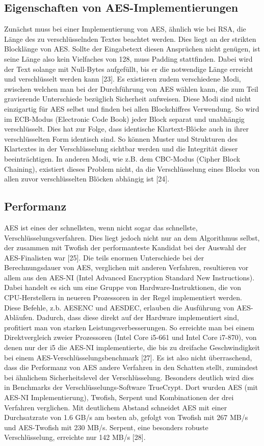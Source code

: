 \documentclass[conference,10pt,a4paper,twocolumn]{IEEEtran}
\begin{document}
\subsection{Eigenschaften von AES-Implementierungen}
Zunächst muss bei einer Implementierung von AES, ähnlich wie bei RSA, die Länge des zu verschlüsselnden Textes beachtet werden. Dies liegt an der strikten Blocklänge von AES. Sollte der Eingabetext diesen Ansprüchen nicht genügen, ist seine Länge also kein Vielfaches von 128, muss Padding stattfinden. Dabei wird der Text solange mit Null-Bytes aufgefüllt, bis er die notwendige Länge erreicht und verschlüsselt werden kann [23]. Es existieren zudem verschiedene Modi, zwischen welchen man bei der Durchführung von AES wählen kann, die zum Teil gravierende Unterschiede bezüglich Sicherheit aufweisen. Diese Modi sind nicht einzigartig für AES selbst und finden bei allen Blockchiffres Verwendung. So wird im ECB-Modus (Electronic Code Book) jeder Block separat und unabhängig verschlüsselt. Dies hat zur Folge, dass identische Klartext-Blöcke auch in ihrer verschlüsselten Form identisch sind. So können Muster und Strukturen des Klartextes in der Verschlüsselung sichtbar werden und die Integrität dieser beeinträchtigen. In anderen Modi, wie z.B. dem CBC-Modus (Cipher Block Chaining), existiert dieses Problem nicht, da die Verschlüsselung eines Blocks von allen zuvor verschlüsselten Blöcken abhängig ist [24]. 

\subsection{Performanz}
AES ist eines der schnellsten, wenn nicht sogar das schnellste, Verschlüsselungsverfahren. Dies liegt jedoch nicht nur an dem Algorithmus selbst, der zusammen mit Twofish der performanteste Kandidat bei der Auswahl der AES-Finalisten war [25]. Die teils enormen Unterschiede bei der Berechnungsdauer von AES, verglichen mit anderen Verfahren, resultieren vor allem aus den AES-NI (Intel Advanced Encryption Standard New Instructions). Dabei handelt es sich um eine Gruppe von Hardware-Instruktionen, die von CPU-Herstellern in neueren Prozessoren in der Regel implementiert werden. Diese Befehle, z.b. AESENC und AESDEC, erlauben die Ausführung von AES-Abläufen. Dadurch, dass diese direkt auf der Hardware implementiert sind, profitiert man von starken Leistungsverbesserungen. So erreichte man bei einem Direktvergleich zweier Prozessoren (Intel Core i5-661 und Intel Core i7-870), von denen nur der i5 die AES-NI implementierte, die bis zu dreifache Geschwindigkeit bei einem AES-Verschlüsselungsbenchmark [27]. Es ist also nicht überraschend, dass die Performanz von AES andere Verfahren in den Schatten stellt, zumindest bei ähnlichem Sicherheitslevel der Verschlüsselung. Besonders deutlich wird dies in Benchmarks der Verschlüsselungs-Software TrueCrypt. Dort wurden AES (mit AES-NI Implementierung), Twofish, Serpent und Kombinationen der drei Verfahren verglichen. Mit deutlichem Abstand schneidet AES mit einer Durchsatzrate von 1.6 GB/s am besten ab, gefolgt von Twofish mit 267 MB/s und AES-Twofish mit 230 MB/s. Serpent, eine besonders robuste Verschlüsselung, erreichte nur 142 MB/s [28].
\end{document}
